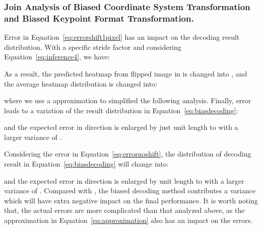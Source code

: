 \documentclass[10pt,journal,compsoc]{IEEEtran}
\begin{document}
\subsubsection{Join Analysis of Biased Coordinate System Transformation and Biased Keypoint Format Transformation.}

Error  in Equation~\ref{eq:errorshift1pixel} has an impact on the decoding result distribution. With a specific stride factor  and considering Equation~\ref{eq:inference4}, we have:

As a result, the predicted heatmap from flipped image in  is changed into , and the average heatmap distribution is changed into:

where we use a approximation to simplified the following analysis. Finally, error  leads to a variation of the result distribution in Equation~\ref{eq:biasdecoding}:

and the expected error in  direction is enlarged by just  unit length to  with a larger variance of . 

Considering the error  in Equation~\ref{eq:errornoshift}, the distribution of decoding result in Equation~\ref{eq:biasdecoding} will change into:

and the expected error in  direction is enlarged by  unit length to  with a larger variance of . Compared with , the biased decoding method contributes a variance which will have extra negative impact on the final performance. It is worth noting that, the actual errors are more complicated than that analyzed above, as the approximation in Equation~\ref{eq:approximation} also has an impact on the errors.
\end{document}
